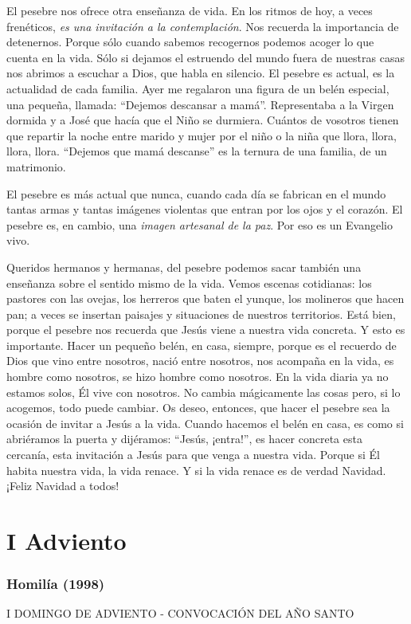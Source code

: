 El pesebre nos ofrece otra enseñanza de vida. En los ritmos de hoy, a
veces frenéticos, \emph{es una invitación a la contemplación}. Nos
recuerda la importancia de detenernos. Porque sólo cuando sabemos
recogernos podemos acoger lo que cuenta en la vida. Sólo si dejamos el
estruendo del mundo fuera de nuestras casas nos abrimos a escuchar a
Dios, que habla en silencio. El pesebre es actual, es la actualidad de
cada familia. Ayer me regalaron una figura de un belén especial, una
pequeña, llamada: ``Dejemos descansar a mamá''. Representaba a la Virgen
dormida y a José que hacía que el Niño se durmiera. Cuántos de vosotros
tienen que repartir la noche entre marido y mujer por el niño o la niña
que llora, llora, llora, llora. ``Dejemos que mamá descanse'' es la
ternura de una familia, de un matrimonio.

El pesebre es más actual que nunca, cuando cada día se fabrican en el
mundo tantas armas y tantas imágenes violentas que entran por los ojos y
el corazón. El pesebre es, en cambio, una \emph{imagen artesanal de la
	paz}. Por eso es un Evangelio vivo.

Queridos hermanos y hermanas, del pesebre podemos sacar también una
enseñanza sobre el sentido mismo de la vida. Vemos escenas cotidianas:
los pastores con las ovejas, los herreros que baten el yunque, los
molineros que hacen pan; a veces se insertan paisajes y situaciones de
nuestros territorios. Está bien, porque el pesebre nos recuerda que
Jesús viene a nuestra vida concreta. Y esto es importante. Hacer un
pequeño belén, en casa, siempre, porque es el recuerdo de Dios que vino
entre nosotros, nació entre nosotros, nos acompaña en la vida, es hombre
como nosotros, se hizo hombre como nosotros. En la vida diaria ya no
estamos solos, Él vive con nosotros. No cambia mágicamente las cosas
pero, si lo acogemos, todo puede cambiar. Os deseo, entonces, que hacer
el pesebre sea la ocasión de invitar a Jesús a la vida. Cuando hacemos
el belén en casa, es como si abriéramos la puerta y dijéramos: ``Jesús,
¡entra!'', es hacer concreta esta cercanía, esta invitación a Jesús para
que venga a nuestra vida. Porque si Él habita nuestra vida, la vida
renace. Y si la vida renace es de verdad Navidad. ¡Feliz Navidad a
todos!

\section{I Adviento}

\subsubsection{Homilía (1998)}
I DOMINGO DE ADVIENTO - CONVOCACIÓN DEL AÑO SANTO

